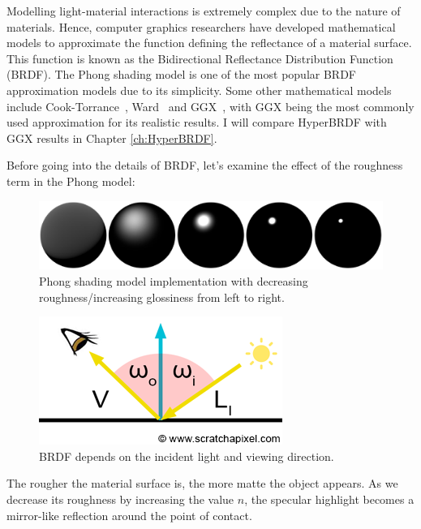 Modelling light-material interactions is extremely complex due to the nature of materials. Hence, computer graphics researchers have developed mathematical models to approximate the function defining the reflectance of a material surface. This function is known as the Bidirectional Reflectance Distribution Function (\gls{BRDF}). The Phong shading model is one of the most popular \gls{BRDF} approximation models due to its simplicity. Some other mathematical models include Cook-Torrance~\cite{cooktorrance1982}, Ward~\cite{ward1992} and GGX~\cite{walter2007microfacet}, with GGX being the most commonly used approximation for its realistic results. I will compare HyperBRDF with GGX results in Chapter \ref{ch:HyperBRDF}.

Before going into the details of BRDF, let's examine the effect of the roughness term in the Phong model:

\begin{figure}[ht]
  \centering
   \includegraphics[width=\linewidth]{Images/Phong-roughness-coeff.pdf}
   \caption{Phong shading model implementation with decreasing roughness/increasing glossiness from left to right.}
   \label{fig:phong-roughness}
\end{figure}

\begin{figure}
  \centering
   \includegraphics[width=\linewidth]{Images/shad2-brdfdir}
   \caption{BRDF depends on the incident light and viewing direction.}
   \label{fig:brdf}
\end{figure}
The rougher the material surface is, the more matte the object appears. As we decrease its roughness by increasing the value $n$, the specular highlight becomes a mirror-like reflection around the point of contact. 


